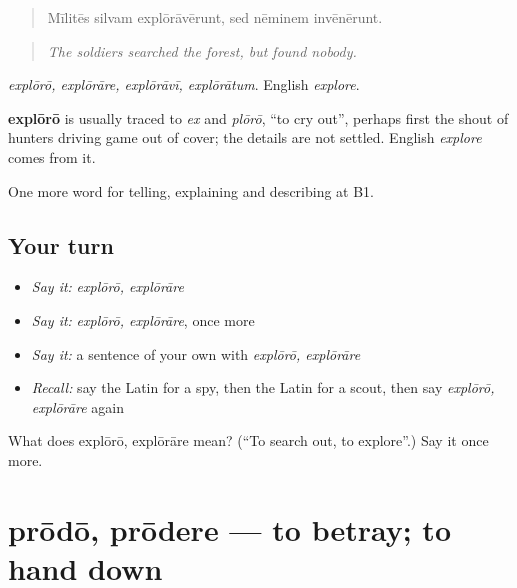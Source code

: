 \begin{quote}
Mīlitēs silvam explōrāvērunt, sed nēminem invēnērunt.
\end{quote}

\begin{quote}
\emph{The soldiers searched the forest, but found nobody.}
\end{quote}

\emph{explōrō, explōrāre, explōrāvī, explōrātum}. English \emph{explore}.

\begin{cousinweb}
\textbf{explōrō} is usually traced to \emph{ex} and \emph{plōrō}, \textquotedblleft{}to cry out\textquotedblright{}, perhaps first the shout of hunters driving game out of cover; the details are not settled. English \emph{explore} comes from it.
\end{cousinweb}

\begin{grammarlens}[title={What you've built}]
One more word for telling, explaining and describing at B1.
\end{grammarlens}

\subsection*{Your turn}
\begin{itemize}
\raggedright
  \item \emph{Say it:} \emph{explōrō, explōrāre}
  \item \emph{Say it:} \emph{explōrō, explōrāre}, once more
  \item \emph{Say it:} a sentence of your own with \emph{explōrō, explōrāre}
  \item \emph{Recall:} say the Latin for a spy, then the Latin for a scout, then say \emph{explōrō, explōrāre} again
\end{itemize}

\begin{tcolorbox}[breakable,colback=teal!4,colframe=teal!35!black,title={Before you move on}]
What does explōrō, explōrāre mean? (\textquotedblleft{}To search out, to explore\textquotedblright{}.) Say it once more.
\end{tcolorbox}
\section[prōdō, prōdere]{prōdō, prōdere — to betray; to hand down}

\label{lesson:LA-C302-prodo}



